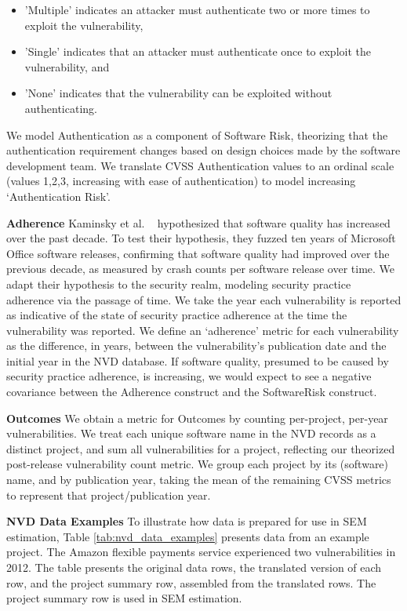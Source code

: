 \begin{itemize}
	\begin{itemize}
		\item 'Multiple' indicates an attacker must authenticate two or more times to exploit the vulnerability, 
		\item 'Single' indicates that an attacker must authenticate once to exploit the vulnerability, and 
		\item 'None' indicates that the vulnerability can be exploited without authenticating.  
	\end{itemize}
	We model Authentication as a component of Software Risk, theorizing that the authentication requirement changes based on design choices made by the software development team. We translate CVSS Authentication values to an ordinal scale (values 1,2,3, increasing with ease of authentication) to model increasing `Authentication Risk'.
\end{itemize}
  
\textbf{Adherence}
Kaminsky et al. ~\cite{kaminsky2011showing} hypothesized that software quality has increased over the past decade. To test their hypothesis, they fuzzed ten years of Microsoft Office software releases, confirming that software quality had improved over the previous decade, as measured by crash counts per software release over time. We adapt their hypothesis to the security realm, modeling security practice adherence via the passage of time. We take the year each vulnerability is reported as indicative of the state of security practice adherence at the time the vulnerability was reported. We define an `adherence' metric for each vulnerability as the difference, in years, between the vulnerability's publication date and the initial year in the NVD database. If software quality, presumed to be caused by security practice adherence, is increasing, we would expect to see a negative covariance between the Adherence construct and the SoftwareRisk construct. 

\textbf{Outcomes}
We obtain a metric for Outcomes by counting per-project, per-year vulnerabilities. We treat each unique software name in the NVD records as a distinct project, and sum all vulnerabilities for a project, reflecting our theorized post-release vulnerability count metric. We group each project by its (software) name, and by publication year, taking the mean of the remaining CVSS metrics to represent that project/publication year. 

\textbf{NVD Data Examples}
To illustrate how data is prepared for use in SEM estimation, Table \ref{tab:nvd_data_examples} presents data from an example project. The Amazon flexible payments service experienced two vulnerabilities in 2012. The table presents the original data rows, the translated version of each row, and the project summary row, assembled from the translated rows. The project summary row is used in SEM estimation.

